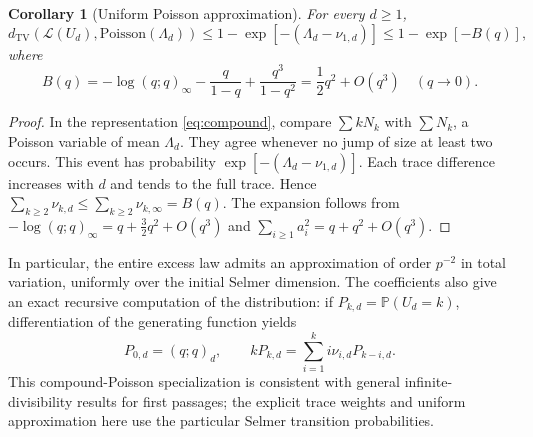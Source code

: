 \documentclass[11pt]{article}
\newtheorem{corollary}[theorem]{Corollary}
\theoremstyle{definition}\newtheorem{definition}[theorem]{Definition}
\newcommand{\Prob}{\mathbb P}
\newcommand{\TV}{d_{\mathrm{TV}}}
\begin{document}
\begin{corollary}[Uniform Poisson approximation]\label{cor:pois}
For every $d\geq1$,
\begin{equation}\label{eq:tvpoi}
 \TV(\mathcal L(U_d),\mathrm{Poisson}(\Lambda_d))
 \leq1-\exp[-(\Lambda_d-\nu_{1,d})]
 \leq1-\exp[-B(q)],
\end{equation}
where
\[
 B(q)=-\log(q;q)_\infty-\frac q{1-q}+\frac{q^3}{1-q^2}
      =\frac12q^2+O(q^3)\quad(q\to0).
\]
\end{corollary}
\begin{proof}
In the representation \eqref{eq:compound}, compare $\sum kN_k$ with $\sum N_k$, a Poisson variable of mean $\Lambda_d$. They agree whenever no jump of size at least two occurs. This event has probability $\exp[-(\Lambda_d-\nu_{1,d})]$. Each trace difference increases with $d$ and tends to the full trace. Hence $\sum_{k\geq2}\nu_{k,d}\leq\sum_{k\geq2}\nu_{k,\infty}=B(q)$. The expansion follows from $-\log(q;q)_\infty=q+\tfrac32q^2+O(q^3)$ and $\sum_{i\geq1}a_i^2=q+q^2+O(q^3)$.
\end{proof}

In particular, the entire excess law admits an approximation of order $p^{-2}$ in total variation, uniformly over the initial Selmer dimension. The coefficients also give an exact recursive computation of the distribution: if $P_{k,d}=\Prob(U_d=k)$, differentiation of the generating function yields
\[
 P_{0,d}=(q;q)_d,\qquad kP_{k,d}=\sum_{i=1}^{k}i\nu_{i,d}P_{k-i,d}.
\]
This compound-Poisson specialization is consistent with general infinite-divisibility results for first passages; the explicit trace weights and uniform approximation here use the particular Selmer transition probabilities.
\end{document}
